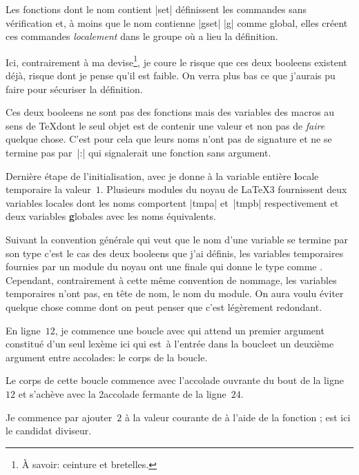 Les \glspl{fonction} dont le nom contient |set| définissent les
commandes sans vérification et, à moins que le nom contienne |gset|
\TO |g| comme \og global\fg\TF, elles créent ces commandes
\emph{localement} \CAD{} dans le groupe où a lieu la définition.

Ici, contrairement à ma devise\footnote{À savoir: \og ceinture et
  bretelles\fg.}, je coure le risque que ces deux \glspl{booleen}
existent déjà, risque dont je pense qu'il est faible. On verra plus
bas ce que j'aurais pu faire pour sécuriser la définition.

Ces deux \glspl{booleen} ne sont pas des \glspl{fonction} mais des
\glspl{variable} \CAD{} des macros \TO au sens de \TeX{}\TF dont le
seul objet est de contenir une valeur et non pas de \emph{faire}
quelque chose. C'est pour cela que leurs noms n'ont pas de
\gls{signature} et ne se termine pas par~|:| qui signalerait une
\gls{fonction} sans argument.

Dernière étape de l'initialisation, avec  je donne
à la variable entière \textbf{l}ocale temporaire 
la valeur~\(1\). Plusieurs \glspl{module} du noyau de \LaTeX3
fournissent deux variables locales dont les noms comportent |tmpa|
et~|tmpb| respectivement et deux variables \textbf{g}lobales \TO avec
les noms équivalents\TF.

Suivant la convention générale qui veut que le nom d'une
\gls{variable} se termine par son type \TO c'est le cas des deux
\glspl{booleen} que j'ai définis\TF, les variables temporaires
fournies par un \gls{module} du noyau ont une finale qui donne le type
comme . Cependant, contrairement à cette même
convention de nommage, les variables temporaires n'ont pas, en tête de
nom, le nom du module. On aura voulu éviter quelque chose comme
 dont on peut penser que c'est légèrement
redondant.

En ligne~\(12\), je commence une boucle \TANTQUE avec
 qui attend un premier argument constitué d'un
seul lexème \TO ici  qui est~\VRAI à l'entrée
dans la boucle\TF et un deuxième argument entre accolades: le corps de
la boucle.

Le corps de cette boucle commence avec l'accolade ouvrante du bout de
la ligne~\(12\) et s'achève avec la 2\ieme accolade fermante de la
ligne~\(24\).

Je commence par ajouter~\(2\) à la valeur courante de
 à l'aide de la \gls{fonction} ;
 est ici le candidat diviseur.

